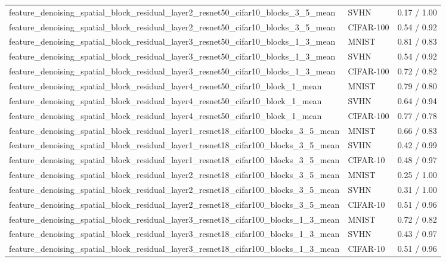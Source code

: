 \begin{tabular}{lll}
feature\_denoising\_spatial\_block\_residual\_layer2\_resnet50\_cifar10\_blocks\_3\_5\_mean & SVHN & 0.17 / 1.00 \\
feature\_denoising\_spatial\_block\_residual\_layer2\_resnet50\_cifar10\_blocks\_3\_5\_mean & CIFAR-100 & 0.54 / 0.92 \\
feature\_denoising\_spatial\_block\_residual\_layer3\_resnet50\_cifar10\_blocks\_1\_3\_mean & MNIST & 0.81 / 0.83 \\
feature\_denoising\_spatial\_block\_residual\_layer3\_resnet50\_cifar10\_blocks\_1\_3\_mean & SVHN & 0.54 / 0.92 \\
feature\_denoising\_spatial\_block\_residual\_layer3\_resnet50\_cifar10\_blocks\_1\_3\_mean & CIFAR-100 & 0.72 / 0.82 \\
feature\_denoising\_spatial\_block\_residual\_layer4\_resnet50\_cifar10\_block\_1\_mean & MNIST & 0.79 / 0.80 \\
feature\_denoising\_spatial\_block\_residual\_layer4\_resnet50\_cifar10\_block\_1\_mean & SVHN & 0.64 / 0.94 \\
feature\_denoising\_spatial\_block\_residual\_layer4\_resnet50\_cifar10\_block\_1\_mean & CIFAR-100 & 0.77 / 0.78 \\
feature\_denoising\_spatial\_block\_residual\_layer1\_resnet18\_cifar100\_blocks\_3\_5\_mean & MNIST & 0.66 / 0.83 \\
feature\_denoising\_spatial\_block\_residual\_layer1\_resnet18\_cifar100\_blocks\_3\_5\_mean & SVHN & 0.42 / 0.99 \\
feature\_denoising\_spatial\_block\_residual\_layer1\_resnet18\_cifar100\_blocks\_3\_5\_mean & CIFAR-10 & 0.48 / 0.97 \\
feature\_denoising\_spatial\_block\_residual\_layer2\_resnet18\_cifar100\_blocks\_3\_5\_mean & MNIST & 0.25 / 1.00 \\
feature\_denoising\_spatial\_block\_residual\_layer2\_resnet18\_cifar100\_blocks\_3\_5\_mean & SVHN & 0.31 / 1.00 \\
feature\_denoising\_spatial\_block\_residual\_layer2\_resnet18\_cifar100\_blocks\_3\_5\_mean & CIFAR-10 & 0.51 / 0.96 \\
feature\_denoising\_spatial\_block\_residual\_layer3\_resnet18\_cifar100\_blocks\_1\_3\_mean & MNIST & 0.72 / 0.82 \\
feature\_denoising\_spatial\_block\_residual\_layer3\_resnet18\_cifar100\_blocks\_1\_3\_mean & SVHN & 0.43 / 0.97 \\
feature\_denoising\_spatial\_block\_residual\_layer3\_resnet18\_cifar100\_blocks\_1\_3\_mean & CIFAR-10 & 0.51 / 0.96 \\

\end{tabular}

